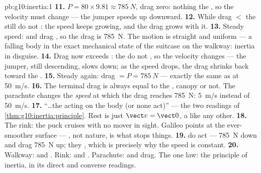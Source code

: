 \begin{solution}{pb:g10:inertia:1}
\textbf{11.}  $P = 80 \times 9.81 \approx \qty{785}{N}$, drag
zero: nothing  the , so the velocity must change ---
the jumper speeds up downward.
\textbf{12.} While drag $<$  the  still do not :
the speed keeps growing, and the drag grows with it.
\textbf{13.} Steady speed:  and drag , so the drag is
\qty{785}{N}. The motion is straight and uniform --- a falling body in
the exact mechanical state of the suitcase on the walkway: inertia in
disguise.
\textbf{14.} Drag now exceeds : the  do not , so
the velocity changes --- the jumper, still descending, slows down; as
the speed drops, the drag shrinks back toward the .
\textbf{15.} Steady again: drag $= P = \qty{785}{N}$ --- exactly the
same as at \qty{50}{m/s}.
\textbf{16.} The terminal drag is always equal to the , canopy or
not. The parachute changes the \emph{speed} at which the drag reaches
\qty{785}{N}: \qty{5}{m/s} instead of \qty{50}{m/s}.
\textbf{17.} ``\dots the  acting on the body  (or none
act)'' --- the two readings of \cref{thm:g10:inertia:principle}. Rest
is just $\vect v = \vect 0$, a  like any other.
\textbf{18.} The rink: the puck cruises with no mover in sight. Galileo
points at the ever-smoother surface --- , not nature, is what
stops things.
\textbf{19.}  do act ---  \qty{785}{N} down and drag
\qty{785}{N} up; they \emph{}, which is precisely why the
speed is constant.
\textbf{20.} Walkway:  and . Rink:  and
. Parachute:  and drag. The one law: the principle
of inertia, in its direct and converse readings.
\end{solution}
